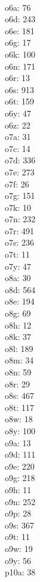 \begin{multicols}{8}
  \\ o6a: 76
  \\ o6d: 243
  \\ o6e: 181
  \\ o6g: 17
  \\ o6k: 100
  \\ o6n: 171
  \\ o6r: 13
  \\ o6s: 913
  \\ o6t: 159
  \\ o6y: 47
  \\ o6z: 22
  \\ o7a: 31
  \\ o7c: 14
  \\ o7d: 336
  \\ o7e: 273
  \\ o7f: 26
  \\ o7g: 151
  \\ o7k: 10
  \\ o7n: 232
  \\ o7r: 491
  \\ o7s: 236
  \\ o7t: 11
  \\ o7y: 47
  \\ o8a: 30
  \\ o8d: 564
  \\ o8e: 194
  \\ o8g: 69
  \\ o8h: 12
  \\ o8k: 37
  \\ o8l: 189
  \\ o8m: 34
  \\ o8n: 59
  \\ o8r: 29
  \\ o8s: 467
  \\ o8t: 117
  \\ o8w: 18
  \\ o8y: 100
  \\ o9a: 13
  \\ o9d: 111
  \\ o9e: 220
  \\ o9g: 218
  \\ o9h: 11
  \\ o9n: 252
  \\ o9p: 28
  \\ o9s: 367
  \\ o9t: 11
  \\ o9w: 19
  \\ o9y: 56
  \\ p10a: 38

\end{multicols}
